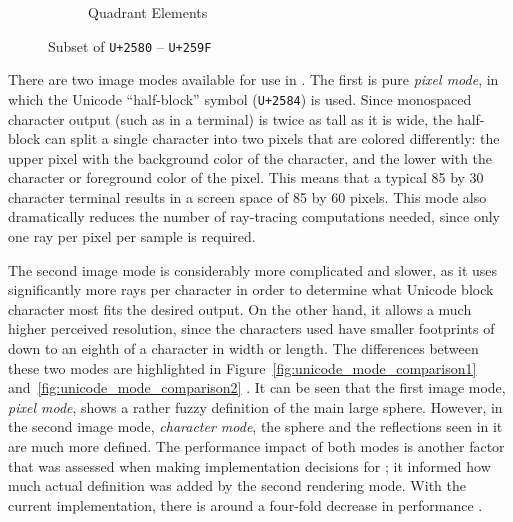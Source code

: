\begin{figure}[htb]
\begin{subfigure}[htb]{0.51\textwidth}
    \caption{Quadrant Elements}
    \label{fig:unicode_quadrant_characters}
  \end{subfigure}
  \caption{Subset of \texttt{U+2580} -- \texttt{U+259F} \cite{unicode}}
  \label{fig:unicode_characters}
\end{figure}

There are two image modes available for use in \name.
The first is pure {\it pixel mode}, in which the Unicode ``half-block'' symbol (\texttt{U+2584}) is used.
Since monospaced character output (such as in a terminal) is twice as tall as it is wide, the half-block can split a single character into two pixels that are colored differently: the upper pixel with the background color of the character, and the lower with the character or foreground color of the pixel.
This means that a typical 85 by 30 character terminal results in a screen space of 85 by 60 pixels.
This mode also dramatically reduces the number of ray-tracing computations needed, since only one ray per pixel per sample is required.

The second image mode is considerably more complicated and slower, as it uses significantly more rays per character in order to determine what Unicode block character most fits the desired output.
On the other hand, it allows a much higher perceived resolution, since the characters used have smaller footprints of down to an eighth of a character in width or length.
The differences between these two modes are highlighted in Figure~\ref{fig:unicode_mode_comparison1} and~\ref{fig:unicode_mode_comparison2} .
It can be seen that the first image mode, {\it pixel mode}, shows a rather fuzzy definition of the main large sphere.
However, in the second image mode, {\it character mode}, the sphere and the reflections seen in it are much more defined.
The performance impact of both modes is another factor that was assessed when making implementation decisions for \name; it informed how much actual definition was added by the second rendering mode.
With the current implementation, there is around a four-fold decrease in performance .

